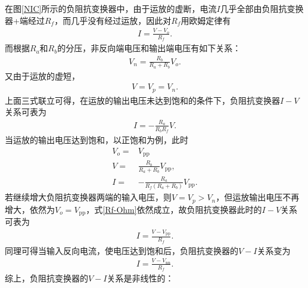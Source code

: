 \documentclass{assignment}
\begin{document}
在图\ref{NIC}所示的负阻抗变换器中，由于运放的虚断，电流$I$几乎全部由负阻抗变换器+端经过$R_f$，而几乎没有经过运放，因此对$R_f$用欧姆定律有
\begin{align}
    \label{Rf-Ohm}
    I=\frac{V-V_o}{R_f}.
\end{align}
而根据$R_a$和$R_b$的分压，非反向端电压和输出端电压有如下关系：
\begin{align}
    V_n=\frac{R_b}{R_a+R_b}V_o.
\end{align}
又由于运放的虚短，
\begin{align}
    V=V_p=V_n.
\end{align}
上面三式联立可得，在运放的输出电压未达到饱和的条件下，负阻抗变换器$I-V$关系可表为
\begin{align}
    I=-\frac{R_a}{R_bR_f}V.
\end{align}
当运放的输出电压达到饱和，以正饱和为例，此时
\begin{align}
    V_o=&V_{\text{pp}}\\
    V=&\frac{R_b}{R_a+R_b}V_{\text{pp}},\\
    I=&-\frac{R_a}{R_f(R_a+R_b)}V_{\text{pp}}.
\end{align}
若继续增大负阻抗变换器两端的输入电压，则$V=V_p>V_n$，但运放输出电压不再增大，依然为$V_o=V_{\text{pp}}$，式\eqref{Rf-Ohm}依然成立，故负阻抗变换器此时的$I-V$关系可表为
\begin{align}
    I=\frac{V-V_{\text{pp}}}{R_f}.
\end{align}
同理可得当输入反向电流，使电压达到饱和后，负阻抗变换器的$V-I$关系变为
\begin{align}
    I=\frac{V-V_{\text{nn}}}{R_f}.
\end{align}
综上，负阻抗变换器的$V-I$关系是非线性的：
\end{document}
